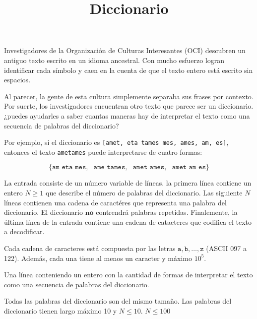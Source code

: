\documentclass{oci}
\title{Diccionario}
\begin{document}
\begin{problemDescription}
Investigadores de la Organización de Culturas Interesantes (OCI) descubren un antiguo texto escrito en un idioma ancestral. Con mucho esfuerzo logran identificar cada símbolo y caen en la cuenta de que el texto entero está escrito sin espacios.

Al parecer, la gente de esta cultura simplemente separaba sus frases por contexto. Por suerte, los investigadores encuentran otro texto que parece ser un diccionario. ¿puedes ayudarles a saber cuantas maneras hay de interpretar el texto como una secuencia de palabras del diccionario?

Por ejemplo, si el diccionario es \texttt{[amet, eta tames mes, ames, am, es]}, entonces el texto \texttt{ametames} puede interpretarse de cuatro formas: 

$$\{\texttt{am eta mes},\ \ \  \texttt{ame tames},\ \ \  \texttt{amet ames},\ \ \  \texttt{amet am es}  \}$$


\end{problemDescription}

\begin{inputDescription}
La entrada consiste de un número variable de líneas. la primera línea contiene un entero $N \geq 1$ que describe el número de palabras del diccionario. Las siguiente $N$ líneas contienen una cadena de caractéres que representa una palabra del diccionario. El diccionario $\textbf{no}$ contrendrá palabras repetidas. Finalemente, la última línea de la entrada contiene una cadena de catacteres que codifica el texto a decodificar. 

Cada cadena de caracteres está compuesta por las letras $\texttt{a},\texttt{b},\dots,\texttt{z}$ (ASCII 097 a 122). Además, cada una tiene al menos un caracter y máximo $10^5$.
\end{inputDescription}

\begin{outputDescription}
Una línea conteniendo un entero con la cantidad de formas de interpretar el texto como una secuencia de palabras del diccionario.
\end{outputDescription}

\begin{scoreDescription}
   Todas las palabras del diccionario son del mismo tamaño. 
   Las palabras del diccionario tienen largo máximo 10 y $N \leq 10$.
   $N \leq 100$
\end{scoreDescription}

\begin{sampleDescription}
\end{sampleDescription}
\end{document}
